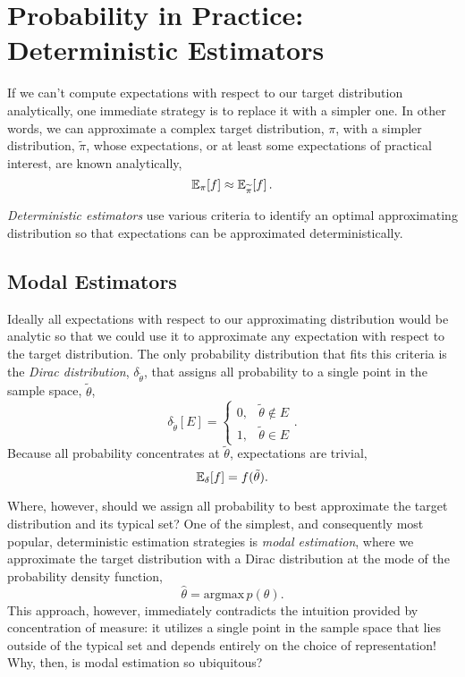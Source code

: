 \chapter{Probability in Practice: Deterministic Estimators}

If we can't compute expectations with respect to our target distribution
analytically, one immediate strategy is to replace it with a simpler one.  
In other words, we can approximate a complex target distribution, $\pi$, 
with a simpler distribution, $\widetilde{\pi}$, whose expectations, or at 
least some expectations of practical interest, are known analytically,
%
\begin{equation*}
\mathbb{E}_{\pi} \! \left[ f \right] 
\approx 
\mathbb{E}_{\widetilde{\pi}} \! \left[ f \right].
\end{equation*}

\emph{Deterministic estimators} use various criteria to identify an 
optimal approximating distribution so that expectations can be 
approximated deterministically.

\section{Modal Estimators}

Ideally all expectations with respect to our approximating distribution 
would be analytic so that we could use it to approximate any 
expectation with respect to the target distribution.  The only
probability distribution that fits this criteria is the \emph{Dirac distribution},
$\delta_{\tilde{\theta}}$, that assigns all probability to a single point 
in the sample space, $\tilde{\theta}$,
%
\begin{equation*}
\delta_{\tilde{\theta}} \! \left[ E \right] = 
\left\{
\begin{array}{rr}
0, & \tilde{\theta} \notin E  \\
1, & \tilde{\theta} \in E
\end{array}
\right. .
\end{equation*}
%
Because all probability concentrates at $\tilde{\theta}$, expectations 
are trivial,
%
\begin{equation*}
\mathbb{E}_{\delta} \! \left[ f \right] 
=
 f ( \tilde{\theta} ).
\end{equation*} 

Where, however, should we assign all probability to best approximate
the target distribution and its typical set?  One of the simplest, and 
consequently most popular, deterministic estimation strategies is 
\emph{modal estimation}, where we approximate the target distribution 
with a Dirac distribution at the mode of the probability density function,
%
\begin{equation*}
\hat{\theta} = \mathrm{argmax} \, p \! \left( \theta \right).
\end{equation*}
%
This approach, however, immediately contradicts the intuition provided by 
concentration of measure: it utilizes a single point in the sample space
that lies outside of the typical set and depends entirely on the choice of
representation!  Why, then, is modal estimation so ubiquitous?

